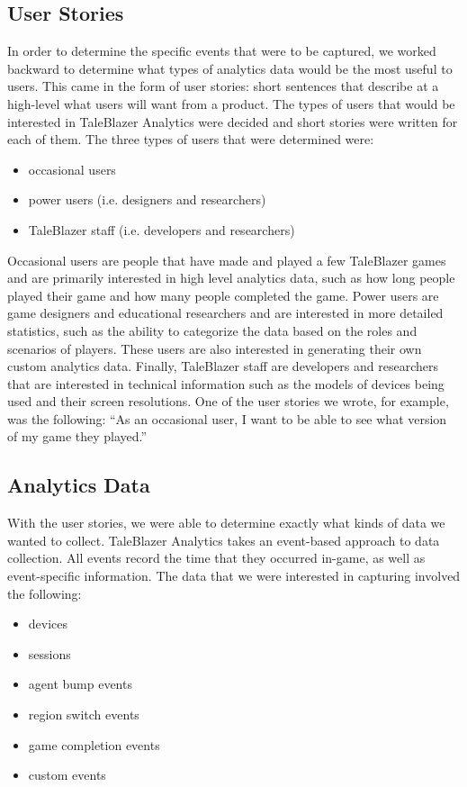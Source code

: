 \subsection{User Stories}

In order to determine the specific events that were to be captured, we worked backward to determine what types of analytics data would be the most useful to users. This came in the form of user stories: short sentences that describe at a high-level what users will want from a product. The types of users that would be interested in TaleBlazer Analytics were decided and short stories were written for each of them.
The three types of users that were determined were: 
	\begin{itemize}
		\item occasional users 
		\item power users (i.e. designers and researchers)
		\item TaleBlazer staff (i.e. developers and researchers)
	\end{itemize}

Occasional users are people that have made and played a few TaleBlazer games and are primarily interested in high level analytics data, such as how long people played their game and how many people completed the game. Power users are game designers and educational researchers and are interested in more detailed statistics, such as the ability to categorize the data based on the roles and scenarios of players. These users are also interested in generating their own custom analytics data. Finally, TaleBlazer staff are developers and researchers that are interested in technical information such as the models of devices being used and their screen resolutions. One of the user stories we wrote, for example, was the following: ``As an occasional user, I want to be able to see what version of my game they played.''

\subsection{Analytics Data} 
\label{sec:analytics_data}

With the user stories, we were able to determine exactly what kinds of data we wanted to collect. TaleBlazer Analytics takes an event-based approach to data collection. All events record the time that they occurred in-game, as well as event-specific information. The data that we were interested in capturing involved the following:
	\begin{itemize}
		\item devices
		\item sessions
		\item agent bump events
		\item region switch events
		\item game completion events
		\item custom events
	\end{itemize}

